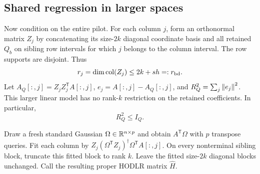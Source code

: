 \subsection{Shared regression in larger spaces}

Now condition on the entire pilot. For each column $j$, form an orthonormal
matrix $Z_j$ by concatenating its size-$2k$ diagonal coordinate basis and
all retained $Q_b$ on sibling row intervals for which $j$ belongs to the
column interval. The row supports are disjoint. Thus
\[
 r_j=\dim\operatorname{col}(Z_j)\le2k+sh=:r_{\rm bd}.
\]
Let $A_Q[:,j]=Z_jZ_j^{\mathsf T}A[:,j]$, $e_j=A[:,j]-A_Q[:,j]$, and
$R_Q^2=\sum_j\left\lVert e_j\right\rVert^2$. This larger linear model has no rank-$k$
restriction on the retained coefficients. In particular,
\begin{equation}\label{eq:projectionvsproper}
 R_Q^2\le I_Q.
\end{equation}

Draw a fresh standard Gaussian $\Omega\in\mathbb R^{n\times p}$ and obtain
$A^{\mathsf T}\Omega$ with $p$ transpose queries. Fit each column by
$Z_j(\Omega^{\mathsf T}Z_j)^\dagger\Omega^{\mathsf T}A[:,j]$.
On every nonterminal sibling block, truncate this fitted block to rank $k$.
Leave the fitted size-$2k$ diagonal blocks unchanged. Call the resulting
proper HODLR matrix $\widehat H$.

